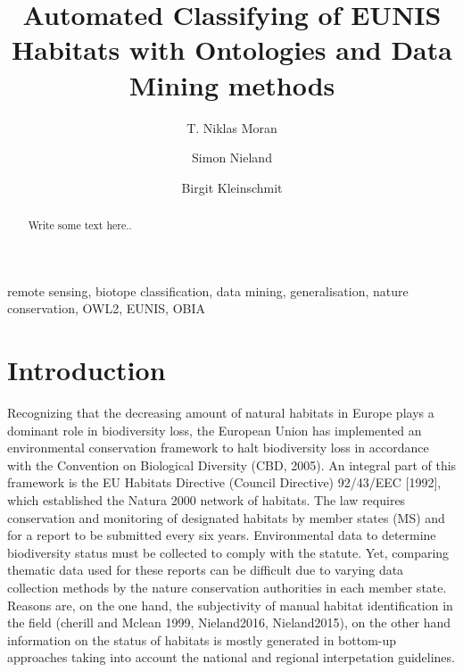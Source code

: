 \documentclass[authoryear, review,12pt,number]{elsarticle}
\begin{document}
\begin{frontmatter}
\linenumbers
\title{Automated Classifying of EUNIS Habitats with Ontologies and Data Mining
methods}


\author[TUB]{T. Niklas Moran}

\author[TUB]{Simon Nieland}
\author[TUB]{Birgit Kleinschmit}


\address[TUB]{Geoinformation in Environmental Planning Lab, Technische
Universit\"at Berlin, Stra\ss e des 17. Juni 145, 10623 Berlin, Germany}


\begin{abstract}
Write some text here..
\end{abstract}

\begin{keyword}
remote sensing, biotope classification, data mining,
generalisation, nature conservation, OWL2, EUNIS, OBIA
\end{keyword}

\end{frontmatter}

\linenumbers

\section{Introduction} 
Recognizing that the decreasing amount of natural habitats in
Europe %
 plays a dominant role in biodiversity loss, the European Union has implemented
 an environmental conservation framework to halt biodiversity loss in accordance with the
Convention on Biological Diversity (CBD, 2005). An integral part of this
framework is the EU Habitats Directive (Council Directive) 92/43/EEC [1992],
which established the Natura 2000 network of habitats. The law requires
conservation and monitoring of designated habitats by member states (MS) and for
a report to be submitted every six years. Environmental data 
to determine biodiversity status must be collected to comply with the 
statute. Yet, comparing thematic %
data used for these reports can be difficult due to varying data collection
methods by the nature conservation authorities in each member state. %
Reasons are, on the one hand, the subjectivity of manual habitat identification
in the field (cherill and Mclean 1999, Nieland2016, Nieland2015), on the other
hand information on the status of habitats is mostly generated in bottom-up approaches taking into
account the national and regional interpetation guidelines.%
\end{document}
